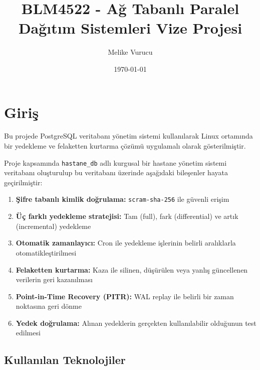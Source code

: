 \documentclass[12pt, a4paper]{report}
\title{BLM4522 - Ağ Tabanlı Paralel Dağıtım Sistemleri Vize Projesi}
\author{Melike Vurucu}
\date{\today}
\begin{document}
\maketitle
\tableofcontents

\chapter{Giriş}

Bu projede PostgreSQL veritabanı yönetim sistemi kullanılarak Linux ortamında bir yedekleme ve felaketten kurtarma çözümü uygulamalı olarak gösterilmiştir.

Proje kapsamında \texttt{hastane\_db} adlı kurgusal bir hastane yönetim sistemi veritabanı oluşturulup bu veritabanı üzerinde aşağıdaki bileşenler hayata geçirilmiştir:

\begin{enumerate}
  \item \textbf{Şifre tabanlı kimlik doğrulama:} \texttt{scram-sha-256} ile güvenli erişim
  \item \textbf{Üç farklı yedekleme stratejisi:} Tam (full), fark (differential) ve artık (incremental) yedekleme
  \item \textbf{Otomatik zamanlayıcı:} Cron ile yedekleme işlerinin belirli aralıklarla otomatikleştirilmesi
  \item \textbf{Felaketten kurtarma:} Kaza ile silinen, düşürülen veya yanlış güncellenen verilerin geri kazanılması
  \item \textbf{Point-in-Time Recovery (PITR):} WAL replay ile belirli bir zaman noktasına geri dönme
  \item \textbf{Yedek doğrulama:} Alınan yedeklerin gerçekten kullanılabilir olduğunun test edilmesi
\end{enumerate}

\section{Kullanılan Teknolojiler}
\end{document}

